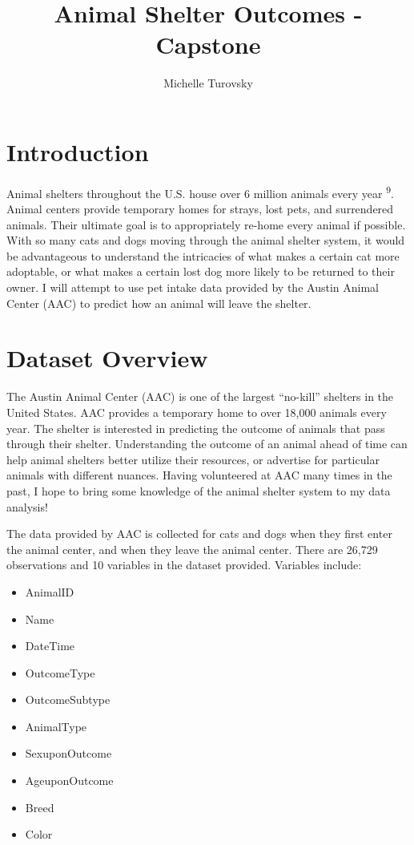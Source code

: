 \documentclass[12pt]{article} %
\title{Animal Shelter Outcomes - Capstone}
\author{\color{black} Michelle Turovsky\\}\color{black}
\begin{document}
\maketitle


\section{Introduction}
Animal shelters throughout the U.S. house over 6 million animals every year \textsuperscript{9}. Animal centers provide temporary homes for strays, lost pets, and surrendered animals. Their ultimate goal is to appropriately re-home every animal if possible. With so many cats and dogs moving through the animal shelter system, it would be advantageous to understand the intricacies of what makes a certain cat more adoptable, or what makes a certain lost dog more likely to be returned to their owner. I will attempt to use pet intake data provided by the Austin Animal Center (AAC) to predict how an animal will leave the shelter. 


\section{Dataset Overview}

The Austin Animal Center (AAC) is one of the largest “no-kill” shelters in the United States. AAC provides a temporary home to over 18,000 animals every year. The shelter is interested in predicting the outcome of animals that pass through their shelter. Understanding the outcome of an animal ahead of time can help animal shelters better utilize their resources, or advertise for particular animals with different nuances. Having volunteered at AAC many times in the past, I hope to bring some knowledge of the animal shelter system to my data analysis!

The data provided by AAC is collected for cats and dogs when they first enter the animal center, and when they leave the animal center. There are 26,729 observations and 10 variables in the dataset provided. Variables include: 

\begin{itemize}
\item AnimalID
\item Name
\item DateTime
\item OutcomeType
\item OutcomeSubtype
\item AnimalType
\item SexuponOutcome
\item AgeuponOutcome
\item Breed
\item Color
\end{itemize}
\end{document}
